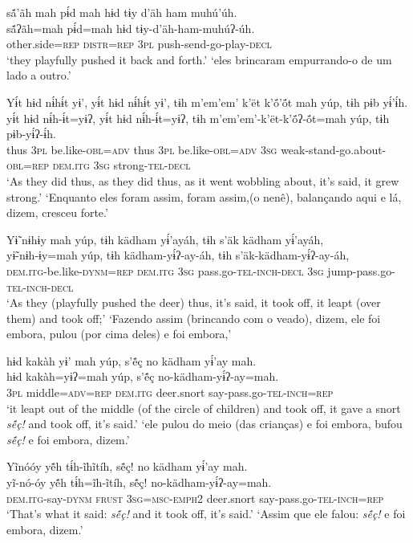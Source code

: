 \documentclass[output=paper,
modfonts,nonflat
]{langsci/langscibook}
\begin{document}
\ea  sã́’ãh mah pɨ́d mah hɨd tɨy d’äh ham muhú’úh.\\
\gll sã́ʔãh=mah pɨ́d=mah hɨd tɨy-d’äh-ham-muhúʔ-úh.\\
     other.side\textsc{=rep} \textsc{distr=rep} \textsc{3pl} push-send-go-play\textsc{-decl}\\
\glt ‘they playfully pushed it back and forth.'
\glt ‘eles brincaram empurrando-o de um lado a outro.'
\z 

\newpage
\ea  Yɨ́t hɨd nɨ́hɨ́t yɨ’, yɨ́t hɨd nɨ́hɨ́t yɨ’, tɨh m’em’em’ k’ët k’ö́’ö́t mah yúp, tɨh pɨb yɨ́’ɨ́h.\\
\gll yɨ́t hɨd nɨ́h-ɨ́t=yɨʔ, yɨ́t hɨd nɨ́h-ɨ́t=yɨʔ, tɨh m’em’em’-k’ët-k’ö́ʔ-ö́t=mah yúp, tɨh pɨb-yɨ́ʔ-ɨ́h.\\
     thus \textsc{3pl} be.like\textsc{-obl=adv} thus \textsc{3pl} be.like\textsc{-obl=adv} \textsc{3sg} weak-stand-go.about\textsc{-obl=rep} \textsc{dem.itg} \textsc{3sg} strong\textsc{-tel-decl}\\
\glt ‘As they did thus, as they did thus, as it went wobbling about, it's said, it grew strong.'
\glt ‘Enquanto eles foram assim, foram assim,(o nenê), balançando aqui e lá, dizem, cresceu forte.'
\z 

\ea  Yɨ̃ nɨhɨy mah yúp, tɨh kädham yɨ́’ayáh, tɨh s’äk kädham yɨ́’ayáh,\\
\gll yɨ̃-nɨh-ɨy=mah yúp, tɨh kädham-yɨ́ʔ-ay-áh, tɨh s’äk-kädham-yɨ́ʔ-ay-áh,\\
     \textsc{dem.itg}-be.like-\textsc{dynm=rep} \textsc{dem.itg} \textsc{3sg} pass.go\textsc{-tel-inch-decl} \textsc{3sg} jump-pass.go\textsc{-tel-inch-decl}\\
\glt ‘As they (playfully pushed the deer) thus, it's said, it took off, it leapt (over them) and took off;'
\glt ‘Fazendo assim (brincando com o veado), dizem, ele foi embora, pulou (por cima deles) e foi embora,'
\z 

\ea  hɨd kakàh yɨ’ mah yúp, s’ẽ́ç no kädham yɨ́’ay mah.\\
\gll hɨd kakàh=yɨʔ=mah yúp, s’ẽ́ç no-kädham-yɨ́ʔ-ay=mah.\\
     \textsc{3pl} middle\textsc{=adv=rep} \textsc{dem.itg} deer.snort say-pass.go\textsc{-tel-inch=rep}\\
\glt ‘it leapt out of the middle (of the circle of children) and took off, it gave a snort \textit{sẽ́ç!} and took off, it’s said.'
\glt ‘ele pulou do meio (das crianças) e foi embora, bufou \textit{sẽ́ç!} e foi embora, dizem.'
\z 

\ea  Yĩnóóy yẽ́h tɨ́h-ĩhĩtíh, sẽ́ç! no kädham yɨ́’ay mah.\\
\gll yĩ-nó-óy yẽ́h tɨ́h=ĩh-ĩtíh, sẽ́ç! no-kädham-yɨ́ʔ-ay=mah.\\
	\textsc{dem.itg-}say\textsc{-dynm} \textsc{frust} \textsc{3sg=msc-emph2} deer.snort say-pass.go\textsc{-tel-inch=rep}\\
\glt ‘That’s what it said: \textit{sẽ́ç!} and it took off, it’s said.’
\glt ‘Assim que ele falou: \textit{sẽ́ç!} e foi embora, dizem.'
\z 
\end{document}
